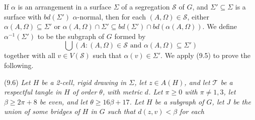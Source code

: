 If $\alpha$ is an arrangement in a surface $\Sigma$ of a segregation $\mathscr{S}$ of $G$, and $\Sigma' \subseteq \Sigma$ is a surface with $bd(\Sigma')$ $\alpha$-normal, then for each $(A, \Omega) \in \mathscr{S}$, either $\alpha(A, \Omega) \subseteq \Sigma'$ or $\alpha(A, \Omega) \cap \Sigma' \subseteq bd(\Sigma') \cap bd(\alpha(A, \Omega))$. We define $\alpha^{-1}(\Sigma')$ to be the subgraph of $G$ formed by
\begin{equation*}
\bigcup (A : (A, \Omega) \in \mathscr{S} \text{ and } \alpha(A, \Omega) \subseteq \Sigma')
\end{equation*}
together with all $v \in V(\mathscr{S})$ such that $\alpha(v) \in \Sigma'$. We apply (9.5) to prove the following.

\stmt
(9.6) \textit{Let $H$ be a 2-cell, rigid drawing in $\Sigma$, let $z \in A(H)$, and let $\mathscr{T}$ be a respectful tangle in $H$ of order $\theta$, with metric $d$. Let $\pi \ge 0$ with $\pi \ne 1, 3$, let $\beta \ge 2\pi + 8$ be even, and let $\theta \ge 16\beta + 17$. Let $H$ be a subgraph of $G$, let $J$ be the union of some bridges of $H$ in $G$ such that $d(z, v) < \beta$ for each}
